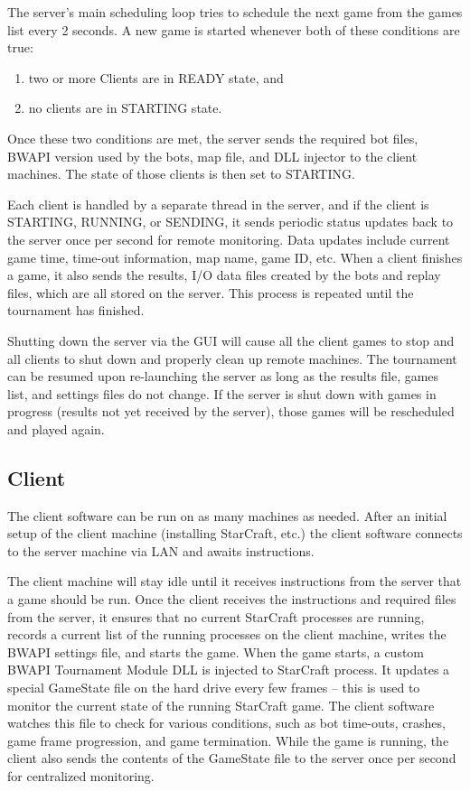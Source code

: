 The server's main scheduling loop tries to schedule the next game from the games list every 2 seconds. A new game is started whenever both of these conditions are true:

\begin{enumerate}
\item two or more Clients are in READY state, and
\item no clients are in STARTING state.
\end{enumerate}

\noindent Once these two conditions are met, the server sends the required bot files, BWAPI version used by the bots, map file, and DLL injector to the client machines. The state of those clients is then set to STARTING.

Each client is handled by a separate thread in the server, and if the client is STARTING, RUNNING, or SENDING, it sends periodic status updates back to the server once per second for remote monitoring. Data updates include current game time, time-out information, map name, game ID, etc. When a client finishes a game, it also sends the results, I/O data files created by the bots and replay files, which are all stored on the server. This process is repeated until the tournament has finished.

Shutting down the server via the GUI will cause all the client games to stop and all clients to shut down and properly clean up remote machines. The tournament can be resumed upon re-launching the server as long as the results file, games list, and settings files do not change. If the server is shut down with games in progress (results not yet received by the server), those games will be rescheduled and played again.

\subsection{Client}

The client software can be run on as many machines as needed. After an initial setup of the client machine (installing StarCraft, etc.) the client software connects to the server machine via LAN and awaits instructions.

The client machine will stay idle until it receives instructions from the server that a game should be run. Once the client receives the instructions and required files from the server, it ensures that no current StarCraft processes are running, records a current list of the running processes on the client machine, writes the BWAPI settings file, and starts the game. When the game starts, a custom BWAPI Tournament Module DLL is injected to StarCraft process. It updates a special GameState file on the hard drive every few frames -- this is used to monitor the current state of the running StarCraft game. The client software watches this file to check for various conditions, such as bot time-outs, crashes, game frame progression, and game termination. While the game is running, the client also sends the contents of the GameState file to the server once per second for centralized monitoring.

